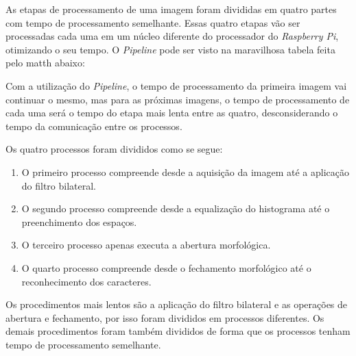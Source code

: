 As etapas de processamento de uma imagem foram divididas em quatro partes com tempo de processamento semelhante. Essas quatro etapas vão ser processadas cada uma em um núcleo diferente do processador do \emph{Raspberry Pi}, otimizando o seu tempo. O \emph{Pipeline} pode ser visto na maravilhosa tabela feita pelo matth abaixo:

Com a utilização do \emph{Pipeline}, o tempo de processamento da primeira imagem vai continuar o mesmo, mas para as próximas imagens, o tempo de processamento de cada uma será o tempo do etapa mais lenta entre as quatro, desconsiderando o tempo da comunicação entre os processos.

Os quatro processos foram divididos como se segue:

\begin{enumerate}
	\item O primeiro processo compreende desde a aquisição da imagem até a aplicação do filtro bilateral.
	\item O segundo processo compreende desde a equalização do histograma até o preenchimento dos espaços.
	\item O terceiro processo apenas executa a abertura morfológica.
	\item O quarto processo compreende desde o fechamento morfológico até o reconhecimento dos caracteres.
\end{enumerate}

Os procedimentos mais lentos são a aplicação do filtro bilateral e as operações de abertura e fechamento, por isso foram divididos em processos diferentes. Os demais procedimentos foram também divididos de forma que os processos tenham tempo de processamento semelhante.


















